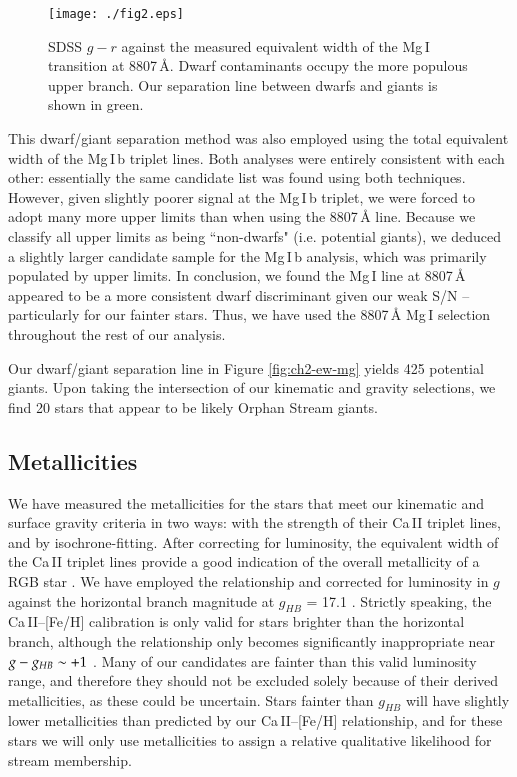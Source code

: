 \begin{figure}[h]
	\texttt{[image: ./fig2.eps]}
	\caption{SDSS $g - r$ against the measured equivalent width of the Mg\,\textsc{I} transition at 8807\,\AA{}. Dwarf contaminants occupy the more populous upper branch. Our separation line between dwarfs and giants is shown in green.}
	\label{fig:ew-mg}
\end{figure}

This dwarf/giant separation method was also employed using the total equivalent width of the Mg\,\textsc{I}\,b triplet lines. Both analyses were entirely consistent with each other: essentially the same candidate list was found using both techniques. However, given slightly poorer signal at the Mg\,\textsc{I}\,b triplet, we were forced to adopt many more upper limits than when using the 8807\,{\AA} line. Because we classify all upper limits as being ``non-dwarfs" (i.e. potential giants), we deduced a slightly larger candidate sample for the Mg\,\textsc{I}\,b analysis, which was primarily populated by upper limits. In conclusion, we found the Mg\,\textsc{I} line at 8807\,{\AA} appeared to be a more consistent dwarf discriminant given our weak S/N \--- particularly for our fainter stars. Thus, we have used the 8807\,{\AA} Mg\,\textsc{I} selection throughout the rest of our analysis.

Our dwarf/giant separation line in Figure \ref{fig:ch2-ew-mg} yields 425 potential giants. Upon taking the intersection of our kinematic and gravity selections, we find 20 stars that appear to be likely Orphan Stream giants.


\subsection{Metallicities}
\label{sec:ch2-metallicities}

We have measured the metallicities for the stars that meet our kinematic and surface gravity criteria in two ways: with the strength of their Ca\,\textsc{II} triplet lines, and by isochrone-fitting. After correcting for luminosity, the equivalent width of the Ca\,\textsc{II} triplet lines provide a good indication of the overall metallicity of a RGB star \citep{Amandroff_Da_Costa_1991}. We have employed the \citet{Starkenburg_et-al_2010} relationship and corrected for luminosity in $g$ against the horizontal branch magnitude at $g_{HB}$ = 17.1 \citep{Newberg_et-al_2010}. Strictly speaking, the Ca\,\textsc{II}\---[Fe/H] calibration is only valid for stars brighter than the horizontal branch, although the relationship only becomes significantly inappropriate near $g \-- g_{HB} \sim +1$ \citep{Saviane_et-al_2012}. Many of our candidates are fainter than this valid luminosity range, and therefore they should not be excluded solely because of their derived metallicities, as these could be uncertain. Stars fainter than $g_{HB}$ will have slightly lower metallicities than predicted by our Ca\,\textsc{II}\---[Fe/H] relationship, and for these stars we will only use metallicities to assign a relative qualitative likelihood for stream membership.

